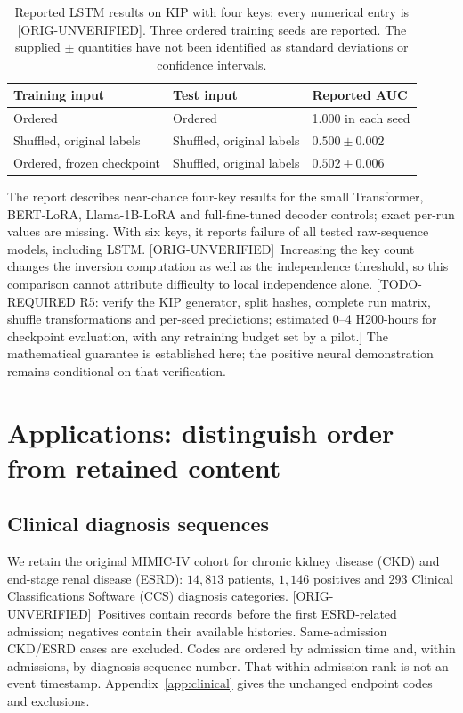 \documentclass[10pt]{article}
\newcommand{\prov}[1]{{\color{black!65}\scriptsize[#1]}}
\newcommand{\ou}{\prov{ORIG-UNVERIFIED}}
\newcommand{\req}[2]{{\color{brown!75!black}\small[TODO-REQUIRED #1: #2]}}
\begin{document}
\begin{table}[H]
\centering\small
\caption{Reported LSTM results on KIP with four keys; every numerical entry is \ou. Three ordered training seeds are reported. The supplied $\pm$ quantities have not been identified as standard deviations or confidence intervals.}
\label{tab:kip}
\begin{tabular}{@{}lll@{}}\toprule
Training input & Test input & Reported AUC \\\midrule
Ordered & Ordered & 1.000 in each seed \\
Shuffled, original labels & Shuffled, original labels & $0.500\pm0.002$ \\
Ordered, frozen checkpoint & Shuffled, original labels & $0.502\pm0.006$ \\
\bottomrule\end{tabular}
\end{table}

The report describes near-chance four-key results for the small Transformer, BERT-LoRA, Llama-1B-LoRA and full-fine-tuned decoder controls; exact per-run values are missing. With six keys, it reports failure of all tested raw-sequence models, including LSTM. \ou\ Increasing the key count changes the inversion computation as well as the independence threshold, so this comparison cannot attribute difficulty to local independence alone. \req{R5}{verify the KIP generator, split hashes, complete run matrix, shuffle transformations and per-seed predictions; estimated 0--4 H200-hours for checkpoint evaluation, with any retraining budget set by a pilot.} The mathematical guarantee is established here; the positive neural demonstration remains conditional on that verification.

\section{Applications: distinguish order from retained content}
\label{sec:applications}
\subsection{Clinical diagnosis sequences}
We retain the original MIMIC-IV cohort \citep{johnson2023} for chronic kidney disease (CKD) and end-stage renal disease (ESRD): $14{,}813$ patients, $1{,}146$ positives and $293$ Clinical Classifications Software (CCS) diagnosis categories. \ou\ Positives contain records before the first ESRD-related admission; negatives contain their available histories. Same-admission CKD/ESRD cases are excluded. Codes are ordered by admission time and, within admissions, by diagnosis sequence number. That within-admission rank is not an event timestamp. Appendix~\ref{app:clinical} gives the unchanged endpoint codes and exclusions.
\end{document}
